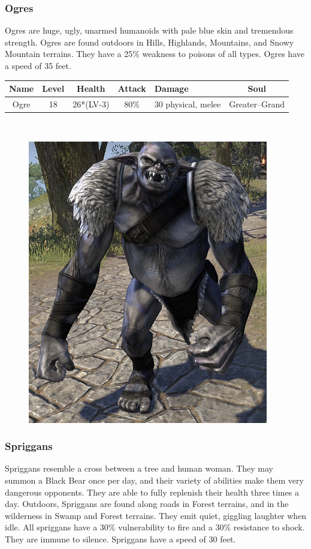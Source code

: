 \documentclass[12pt]{book}
\begin{document}
\subsubsection{Ogres}
Ogres are huge, ugly, unarmed humanoids with pale blue skin and tremendous strength. Ogres are found outdoors in Hills, Highlands, Mountains, and Snowy Mountain terrains. They have a 25\% weakness to poisons of all types. Ogres have a speed of 35 feet.\\

\begin{tabular}{|c|c|c|c|p{}|c|}
\hline
Name & Level & Health & Attack & Damage & Soul\\ \hline
Ogre & 18 & 26*(LV-3) & 80\% & 30 physical, melee & Greater--Grand\\ \hline
\end{tabular}\\

\begin{figure}[h]
	\centering
	\includegraphics[scale=1]{ogre.png}
\end{figure}

\subsubsection{Spriggans}
Spriggans resemble a cross between a tree and human woman. They may summon a Black Bear once per day, and their variety of abilities make them very dangerous opponents. They are able to fully replenish their health three times a day. Outdoors, Spriggans are found along roads in Forest terrains, and in the wilderness in Swamp and Forest terrains. They emit quiet, giggling laughter when idle. All spriggans have a 30\% vulnerability to fire and a 30\% resistance to shock. They are immune to silence. Spriggans have a speed of 30 feet.
\end{document}
